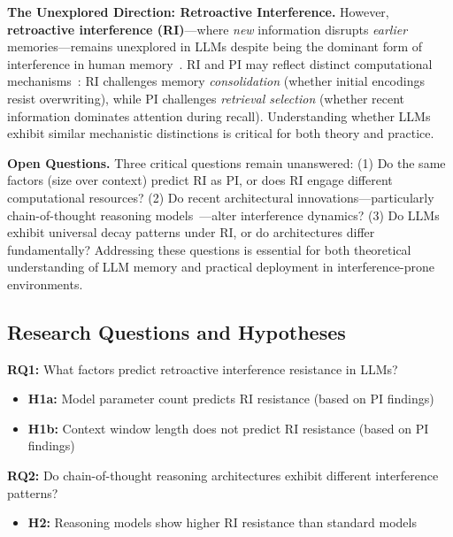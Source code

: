 \documentclass{article}
\begin{document}
\textbf{The Unexplored Direction: Retroactive Interference.} However, \textbf{retroactive interference (RI)}---where \textit{new} information disrupts \textit{earlier} memories---remains unexplored in LLMs despite being the dominant form of interference in human memory~\citep{jenkins1924obliviscence, underwood1957interference}. RI and PI may reflect distinct computational mechanisms~\citep{wixted2004consolidation}: RI challenges memory \textit{consolidation} (whether initial encodings resist overwriting), while PI challenges \textit{retrieval selection} (whether recent information dominates attention during recall). Understanding whether LLMs exhibit similar mechanistic distinctions is critical for both theory and practice.

\textbf{Open Questions.} Three critical questions remain unanswered: (1) Do the same factors (size over context) predict RI as PI, or does RI engage different computational resources? (2) Do recent architectural innovations---particularly chain-of-thought reasoning models~\citep{wei2022chain, openai2024o1}---alter interference dynamics? (3) Do LLMs exhibit universal decay patterns under RI, or do architectures differ fundamentally? Addressing these questions is essential for both theoretical understanding of LLM memory and practical deployment in interference-prone environments.

\subsection{Research Questions and Hypotheses}

\textbf{RQ1:} What factors predict retroactive interference resistance in LLMs?
\begin{itemize}[itemsep=2pt,topsep=3pt,parsep=0pt]
    \item \textbf{H1a:} Model parameter count predicts RI resistance (based on PI findings)
    \item \textbf{H1b:} Context window length does not predict RI resistance (based on PI findings)
\end{itemize}
\vspace{-3pt}

\textbf{RQ2:} Do chain-of-thought reasoning architectures exhibit different interference patterns?
\begin{itemize}[itemsep=2pt,topsep=3pt,parsep=0pt]
    \item \textbf{H2:} Reasoning models show higher RI resistance than standard models
\end{itemize}
\vspace{-3pt}
\end{document}
